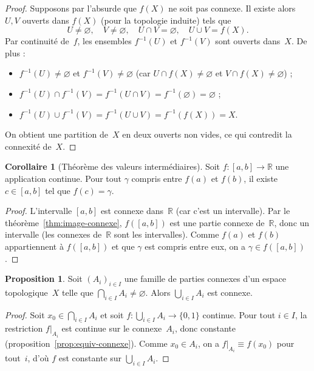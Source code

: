 \documentclass[12pt,a4paper,openany]{book}
\theoremstyle{definition}
\theoremstyle{cours}
\newtheorem{proposition}[theoreme]{Proposition}
\newtheorem{corollaire}[theoreme]{Corollaire}
\theoremstyle{coursnormal}
\begin{document}
\begin{proof}
Supposons par l'absurde que $f(X)$ ne soit pas connexe. Il existe alors
$U, V$ ouverts dans $f(X)$ (pour la topologie induite) tels que
\[
U \neq \varnothing, \quad V \neq \varnothing, \quad U \cap V = \varnothing, \quad
U \cup V = f(X).
\]
Par continuité de~$f$, les ensembles $f^{-1}(U)$ et $f^{-1}(V)$ sont ouverts
dans~$X$. De plus :
\begin{itemize}
  \item $f^{-1}(U) \neq \varnothing$ et $f^{-1}(V) \neq \varnothing$
        (car $U \cap f(X) \neq \varnothing$ et $V \cap f(X) \neq \varnothing$) ;
  \item $f^{-1}(U) \cap f^{-1}(V) = f^{-1}(U \cap V) = f^{-1}(\varnothing)
        = \varnothing$ ;
  \item $f^{-1}(U) \cup f^{-1}(V) = f^{-1}(U \cup V) = f^{-1}(f(X)) = X$.
\end{itemize}
On obtient une partition de~$X$ en deux ouverts non vides, ce qui contredit
la connexité de~$X$.
\end{proof}

\begin{corollaire}[Théorème des valeurs intermédiaires]
\label{cor:valeurs-intermediaires}
Soit $f \colon [a,b] \to \mathbb{R}$ une application continue. Pour tout
$\gamma$ compris entre $f(a)$ et $f(b)$, il existe $c \in [a,b]$ tel que $f(c) = \gamma$.
\end{corollaire}

\begin{proof}
L'intervalle $[a,b]$ est connexe dans~$\mathbb{R}$ (car c'est un intervalle).
Par le théorème~\ref{thm:image-connexe}, $f([a,b])$ est une partie connexe
de~$\mathbb{R}$, donc un intervalle (les connexes de~$\mathbb{R}$ sont les
intervalles). Comme $f(a)$ et $f(b)$ appartiennent à $f([a,b])$ et que $\gamma$
est compris entre eux, on a $\gamma \in f([a,b])$.
\end{proof}

\begin{proposition}
\label{prop:connexe-reunion}
Soit $(A_i)_{i \in I}$ une famille de parties connexes d'un espace topologique~$X$
telle que $\bigcap_{i \in I} A_i \neq \varnothing$. Alors $\bigcup_{i \in I} A_i$
est connexe.
\end{proposition}

\begin{proof}
Soit $x_0 \in \bigcap_{i \in I} A_i$ et soit $f \colon \bigcup_{i \in I} A_i \to \{0,1\}$
continue. Pour tout $i \in I$, la restriction $f|_{A_i}$ est continue sur le
connexe~$A_i$, donc constante (proposition~\ref{prop:equiv-connexe}). Comme
$x_0 \in A_i$, on a $f|_{A_i} \equiv f(x_0)$ pour tout~$i$, d'où $f$ est
constante sur $\bigcup_{i \in I} A_i$.
\end{proof}
\end{document}
